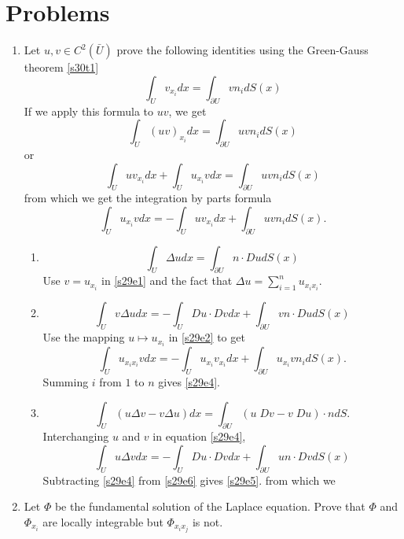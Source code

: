 \documentclass{article}
\theoremstyle{plain}
\numberwithin{thm}{section}
\theoremstyle{plain}
\numberwithin{prop}{section}
\theoremstyle{definition}
\numberwithin{defn}{section}
\theoremstyle{remark}
\numberwithin{equation}{section}
\begin{document}
\section{Problems}\label{s29}
\begin{enumerate}
\setlength{\leftmargin}{0pt}
\item Let $u, v \in C^2(\bar{U})$ prove the following identities using the Green-Gauss theorem \ref{s30t1}
\begin{equation}\label{s29e1}
\int_U v_{x_i} dx = \int_{\partial U} vn_i dS(x)
\end{equation}
If we apply this formula to $uv$, we get
\[
\int_U (uv)_{x_i} dx = \int_{\partial U} uv n_i dS(x)
\]
or
\[
\int_U uv_{x_i} dx + \int_U u_{x_i}v dx = \int_{\partial U} uv n_i dS(x)
\]
from which we get the integration by parts formula
\begin{equation}\label{s29e2}
\int_U u_{x_i} v dx = -\int_U uv_{x_i}dx + \int_{\partial U} uv n_i dS(x).
\end{equation}
\begin{enumerate}
\setlength{\leftmargin}{0pt}
\item 
\begin{equation}\label{s29e3}
\int_U\Delta u dx = \int_{\partial U}n \cdot Du dS(x) 
\end{equation}
Use $v = u_{x_i}$ in \eqref{s29e1} and the fact that $\Delta u = \sum_{i=1}^nu_{x_ix_i}$. 
\item 
\begin{equation}\label{s29e4}
\int_U v\Delta u dx = -\int_U Du\cdot Dv dx + \int_{\partial U}v n\cdot Du dS(x)
\end{equation}
Use the mapping $u \mapsto u_{x_i}$ in \eqref{s29e2} to get
\[
\int_U u_{x_ix_i} v dx = -\int_U u_{x_i}v_{x_i}dx + \int_{\partial U} u_{x_i}v n_i dS(x).
\]
Summing $i$ from $1$ to $n$ gives \eqref{s29e4}.
\item
\begin{equation}\label{s29e5}
\int_U(u \Delta v - v \Delta u) dx = \int_{\partial U}(u\;Dv - v\;Du)\cdot n dS.
\end{equation}
Interchanging $u$ and $v$ in equation \eqref{s29e4},
\begin{equation}\label{s29e6}
\int_U u\Delta v dx = -\int_U Du\cdot Dv dx + \int_{\partial U}u n\cdot Dv dS(x)
\end{equation}
Subtracting \eqref{s29e4} from \eqref{s29e6} gives \eqref{s29e5}.
from which we 
\end{enumerate}

\item Let $\Phi$ be the fundamental solution of the Laplace equation. Prove that $\Phi$ and $\Phi_{x_i}$ are
locally integrable but $\Phi_{x_ix_j}$ is not.


\end{enumerate}
\end{document}
